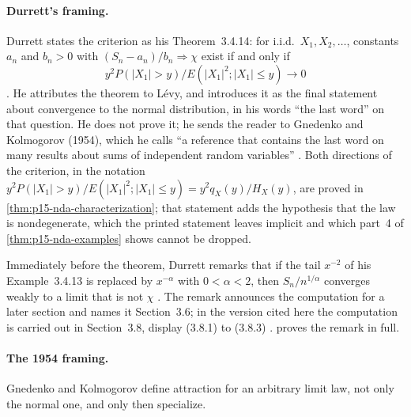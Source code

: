 \paragraph{Durrett's framing.}
Durrett states the criterion as his Theorem~3.4.14: for i.i.d.\
\(X_1,X_2,\ldots\), constants \(a_n\) and \(b_n>0\) with
\((S_n-a_n)/b_n\Rightarrow\chi\) exist if and only if
\[
 y^2P(|X_1|>y)/E(|X_1|^2;|X_1|\leq y)\to0
\]
\cite[p.~152]{DurrettPTEAuthor2019}. He attributes the theorem to
L\'evy, and introduces it as the final statement about convergence to
the normal distribution, in his words ``the last word'' on that
question. He does not prove it; he sends the reader to Gnedenko and
Kolmogorov (1954), which he calls ``a reference that contains the
last word on many results about sums of independent random
variables'' \cite[p.~152]{DurrettPTEAuthor2019}. Both directions of the
criterion, in the notation
\(y^2P(|X_1|>y)/E(|X_1|^2;|X_1|\leq y)=y^2q_X(y)/H_X(y)\), are
proved in \cref{thm:p15-nda-characterization}; that statement adds the
hypothesis that the law is nondegenerate, which the printed statement
leaves implicit and which part~4 of \cref{thm:p15-nda-examples} shows
cannot be dropped.

Immediately before the theorem, Durrett remarks that if the tail
\(x^{-2}\) of his Example~3.4.13 is replaced by \(x^{-\alpha}\) with
\(0<\alpha<2\), then \(S_n/n^{1/\alpha}\) converges weakly to a limit
that is not \(\chi\) \cite[p.~152]{DurrettPTEAuthor2019}. The remark
announces the computation for a later section and names it
Section~3.6; in the version cited here the computation is carried out
in Section~3.8, display (3.8.1) to (3.8.3)
\cite[Section~3.8, pp.~182--183]{DurrettPTEAuthor2019}.
 proves the remark in
full.

\paragraph{The 1954 framing.}
Gnedenko and Kolmogorov define attraction for an arbitrary limit law,
not only the normal one, and only then specialize.

